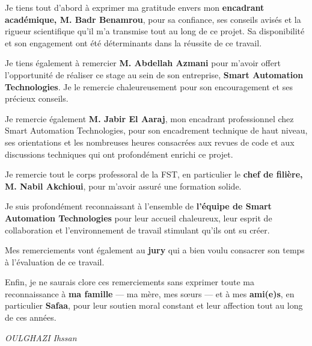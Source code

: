 Je tiens tout d'abord à exprimer ma gratitude envers mon \textbf{encadrant académique, M. Badr Benamrou}, pour sa confiance, ses conseils avisés et la rigueur scientifique qu'il m'a transmise tout au long de ce projet. Sa disponibilité et son engagement ont été déterminants dans la réussite de ce travail.

Je tiens également à remercier \textbf{M. Abdellah Azmani} pour m'avoir offert l'opportunité de réaliser ce stage au sein de son entreprise, \textbf{Smart Automation Technologies}. Je le remercie chaleureusement pour son encouragement et ses précieux conseils.

Je remercie également \textbf{M. Jabir El Aaraj}, mon encadrant professionnel chez Smart Automation Technologies, pour son encadrement technique de haut niveau, ses orientations et les nombreuses heures consacrées aux revues de code et aux discussions techniques qui ont profondément enrichi ce projet.

Je remercie tout le corps professoral de la FST, en particulier le \textbf{chef de filière, M. Nabil Akchioui}, pour m'avoir assuré une formation solide.

Je suis profondément reconnaissant à l'ensemble de \textbf{l'équipe de Smart Automation Technologies} pour leur accueil chaleureux, leur esprit de collaboration et l'environnement de travail stimulant qu'ils ont su créer.

Mes remerciements vont également au \textbf{jury} qui a bien voulu consacrer son temps à l'évaluation de ce travail.

Enfin, je ne saurais clore ces remerciements sans exprimer toute ma reconnaissance à \textbf{ma famille} --- ma mère, mes sœurs --- et à mes \textbf{ami(e)s}, en particulier \textbf{Safaa}, pour leur soutien moral constant et leur affection tout au long de ces années.

\begin{flushright}
\textit{OULGHAZI Ihssan}
\end{flushright}
\newpage


